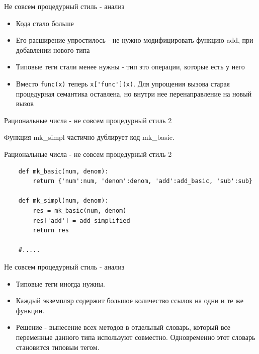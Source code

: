 \documentclass{article}
\begin{document}
\begin{center} Не совсем процедурный стиль - анализ \end{center}
\begin{itemize}
    \item Кода стало больше
    \item Его расширение упростилось - не нужно модифицировать функцию add,
          при добавлении нового типа
    \item Типовые теги стали менее нужны - тип это операции, которые есть у него
    \item Вместо \lstinline!func(x)! теперь \lstinline!x['func'](x)!. 
          Для упрощения вызова старая процедурная семантика оставлена,
          но внутри нее перенаправление на новый вызов
\end{itemize}
\newpage

\begin{center} Рациональные числа - не совсем процедурный стиль 2 \end{center}
    Функция mk\_simpl частично дублирует код mk\_basic.
\newpage

\begin{center} Рациональные числа - не совсем процедурный стиль 2 \end{center}
\begin{lstlisting}
    def mk_basic(num, denom):
        return {'num':num, 'denom':denom, 'add':add_basic, 'sub':sub}

    def mk_simpl(num, denom):
        res = mk_basic(num, denom)
        res['add'] = add_simplified
        return res

    #.....
\end{lstlisting}
\newpage

\begin{center} Не совсем процедурный стиль - анализ \end{center}
\begin{itemize}
    \item Типовые теги иногда нужны.
    \item Каждый экземпляр содержит большое количество ссылок на одни и те же
          функции.
    \item Решение - вынесение всех методов в отдельный словарь, который все 
          переменные данного типа используют совместно. Одновременно этот
          словарь становится типовым тегом.
\end{itemize}
\newpage
\end{document}
